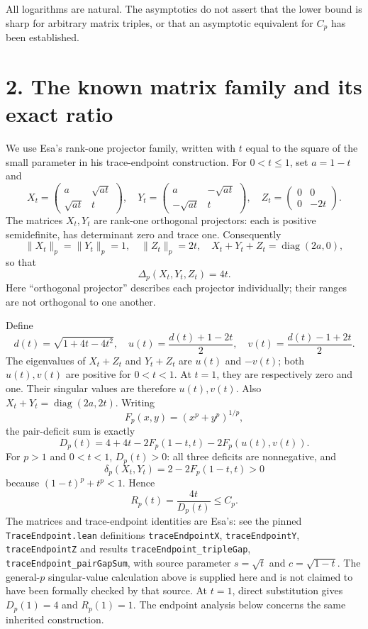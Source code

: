 \documentclass[11pt,a4paper]{article}
\begin{document}
All logarithms are natural. The asymptotics do not assert that the lower bound is sharp for arbitrary matrix triples, or that an asymptotic equivalent for \(C_p\) has been established.

\section*{2. The known matrix family and its exact ratio}\label{the-known-matrix-family-and-its-exact-ratio}

We use Esa's rank-one projector family, written with \(t\) equal to the square of the small parameter in his trace-endpoint construction. For \(0<t\le1\), set \(a=1-t\) and \[
X_t=\begin{pmatrix}a&\sqrt{at}\\\sqrt{at}&t\end{pmatrix},\quad
Y_t=\begin{pmatrix}a&-\sqrt{at}\\-\sqrt{at}&t\end{pmatrix},\quad
Z_t=\begin{pmatrix}0&0\\0&-2t\end{pmatrix}. \tag{5}
\] The matrices \(X_t,Y_t\) are rank-one orthogonal projectors: each is positive semidefinite, has determinant zero and trace one. Consequently \[
\|X_t\|_p=\|Y_t\|_p=1,\quad \|Z_t\|_p=2t,
\quad X_t+Y_t+Z_t=\operatorname{diag}(2a,0),
\] so that \[
\Delta_p(X_t,Y_t,Z_t)=4t. \tag{6}
\] Here ``orthogonal projector'' describes each projector individually; their ranges are not orthogonal to one another.

Define \[
d(t)=\sqrt{1+4t-4t^2},\quad
u(t)=\frac{d(t)+1-2t}{2},\quad
v(t)=\frac{d(t)-1+2t}{2}. \tag{7}
\] The eigenvalues of \(X_t+Z_t\) and \(Y_t+Z_t\) are \(u(t)\) and \(-v(t)\); both \(u(t),v(t)\) are positive for \(0<t<1\). At \(t=1\), they are respectively zero and one. Their singular values are therefore \(u(t),v(t)\). Also \(X_t+Y_t=\operatorname{diag}(2a,2t)\). Writing \[
F_p(x,y)=(x^p+y^p)^{1/p},
\] the pair-deficit sum is exactly \[
D_p(t)=4+4t-2F_p(1-t,t)-2F_p(u(t),v(t)). \tag{8}
\] For \(p>1\) and \(0<t<1\), \(D_p(t)>0\): all three deficits are nonnegative, and \[
\delta_p(X_t,Y_t)=2-2F_p(1-t,t)>0
\] because \((1-t)^p+t^p<1\). Hence \[
R_p(t)=\frac{4t}{D_p(t)}\le C_p. \tag{9}
\] The matrices and trace-endpoint identities are Esa's: see the pinned \texttt{TraceEndpoint.lean} definitions \nolinkurl{traceEndpointX}, \nolinkurl{traceEndpointY}, \nolinkurl{traceEndpointZ} and results \nolinkurl{traceEndpoint_tripleGap}, \nolinkurl{traceEndpoint_pairGapSum}, with source parameter \(s=\sqrt t\) and \(c=\sqrt{1-t}\). The general-\(p\) singular-value calculation above is supplied here and is not claimed to have been formally checked by that source. At \(t=1\), direct substitution gives \(D_p(1)=4\) and \(R_p(1)=1\). The endpoint analysis below concerns the same inherited construction.
\end{document}
